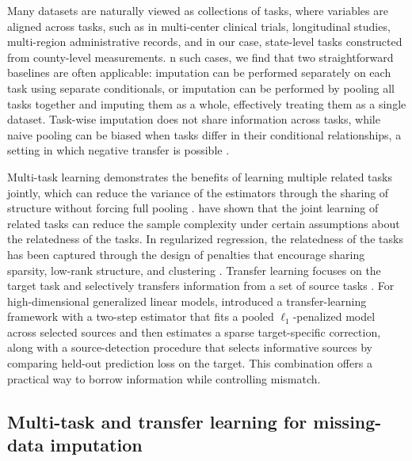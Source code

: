 \documentclass[12pt]{article}
\begin{document}
Many datasets are naturally viewed as collections of tasks, where variables are aligned across tasks, such as in multi-center clinical trials, longitudinal studies, multi-region administrative records, and in our case, state-level tasks constructed from county-level measurements. n such cases, we find that two straightforward baselines are often applicable: imputation can be performed separately on each task using separate conditionals, or imputation can be performed by pooling all tasks together and imputing them as a whole, effectively treating them as a single dataset. Task-wise imputation does not share information across tasks, while naive pooling can be biased when tasks differ in their conditional relationships, a setting in which negative transfer is possible \citep{rosenstein_transfer_2005,pan_survey_2010}.

Multi-task learning demonstrates the benefits of learning multiple related tasks jointly, which can reduce the variance of the estimators through the sharing of structure without forcing full pooling \citep{caruana_multitask_1997,ruder_overview_2017}.
\citet{baxter_model_2000} have shown that the joint learning of related tasks can reduce the sample complexity under certain assumptions about the relatedness of the tasks. In regularized regression, the relatedness of the tasks has been captured through the design of penalties that encourage sharing sparsity, low-rank structure, and clustering \citep{yuan_model_2006,pong_trace_2010,zhang_survey_2021}. Transfer learning focuses on the target task and selectively transfers information from a set of source tasks  \citep{pan_survey_2010,zhuang_comprehensive_2021}.
For high-dimensional generalized linear models, \citet{tian_transfer_2022} introduced a transfer-learning framework with a two-step estimator that fits a pooled $\ell_1$-penalized model across selected sources and then estimates a sparse target-specific correction, along with a source-detection procedure that selects informative sources by comparing held-out prediction loss on the target. This combination offers a practical way to borrow information while controlling mismatch.

\subsection{Multi-task and transfer learning for missing-data imputation}
\label{subsec:background_mtl_impute}
\end{document}
